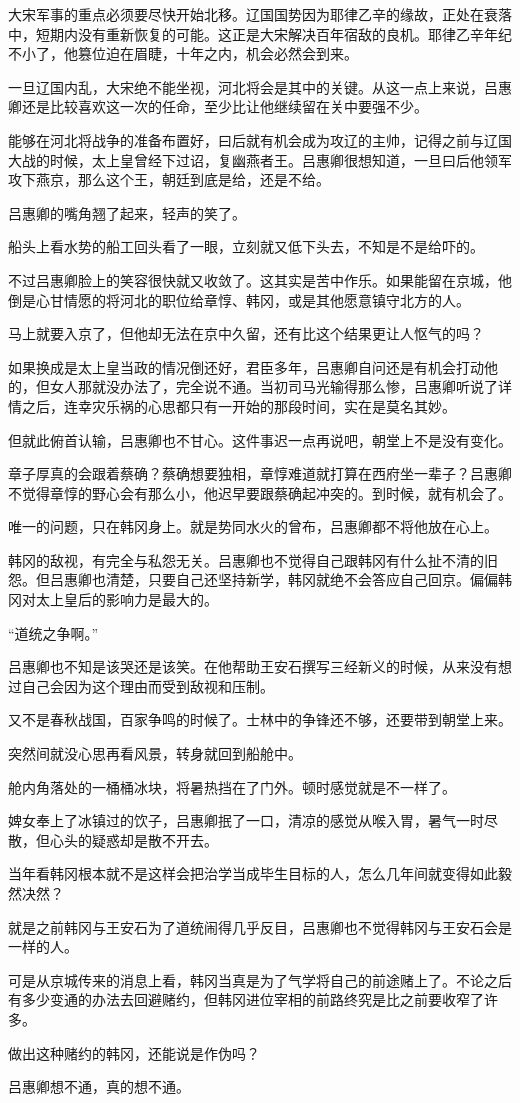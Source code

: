 大宋军事的重点必须要尽快开始北移。辽国国势因为耶律乙辛的缘故，正处在衰落中，短期内没有重新恢复的可能。这正是大宋解决百年宿敌的良机。耶律乙辛年纪不小了，他篡位迫在眉睫，十年之内，机会必然会到来。

一旦辽国内乱，大宋绝不能坐视，河北将会是其中的关键。从这一点上来说，吕惠卿还是比较喜欢这一次的任命，至少比让他继续留在关中要强不少。

能够在河北将战争的准备布置好，曰后就有机会成为攻辽的主帅，记得之前与辽国大战的时候，太上皇曾经下过诏，复幽燕者王。吕惠卿很想知道，一旦曰后他领军攻下燕京，那么这个王，朝廷到底是给，还是不给。

吕惠卿的嘴角翘了起来，轻声的笑了。

船头上看水势的船工回头看了一眼，立刻就又低下头去，不知是不是给吓的。

不过吕惠卿脸上的笑容很快就又收敛了。这其实是苦中作乐。如果能留在京城，他倒是心甘情愿的将河北的职位给章惇、韩冈，或是其他愿意镇守北方的人。

马上就要入京了，但他却无法在京中久留，还有比这个结果更让人怄气的吗？

如果换成是太上皇当政的情况倒还好，君臣多年，吕惠卿自问还是有机会打动他的，但女人那就没办法了，完全说不通。当初司马光输得那么惨，吕惠卿听说了详情之后，连幸灾乐祸的心思都只有一开始的那段时间，实在是莫名其妙。

但就此俯首认输，吕惠卿也不甘心。这件事迟一点再说吧，朝堂上不是没有变化。

章子厚真的会跟着蔡确？蔡确想要独相，章惇难道就打算在西府坐一辈子？吕惠卿不觉得章惇的野心会有那么小，他迟早要跟蔡确起冲突的。到时候，就有机会了。

唯一的问题，只在韩冈身上。就是势同水火的曾布，吕惠卿都不将他放在心上。

韩冈的敌视，有完全与私怨无关。吕惠卿也不觉得自己跟韩冈有什么扯不清的旧怨。但吕惠卿也清楚，只要自己还坚持新学，韩冈就绝不会答应自己回京。偏偏韩冈对太上皇后的影响力是最大的。

“道统之争啊。”

吕惠卿也不知是该哭还是该笑。在他帮助王安石撰写三经新义的时候，从来没有想过自己会因为这个理由而受到敌视和压制。

又不是春秋战国，百家争鸣的时候了。士林中的争锋还不够，还要带到朝堂上来。

突然间就没心思再看风景，转身就回到船舱中。

舱内角落处的一桶桶冰块，将暑热挡在了门外。顿时感觉就是不一样了。

婢女奉上了冰镇过的饮子，吕惠卿抿了一口，清凉的感觉从喉入胃，暑气一时尽散，但心头的疑惑却是散不开去。

当年看韩冈根本就不是这样会把治学当成毕生目标的人，怎么几年间就变得如此毅然决然？

就是之前韩冈与王安石为了道统闹得几乎反目，吕惠卿也不觉得韩冈与王安石会是一样的人。

可是从京城传来的消息上看，韩冈当真是为了气学将自己的前途赌上了。不论之后有多少变通的办法去回避赌约，但韩冈进位宰相的前路终究是比之前要收窄了许多。

做出这种赌约的韩冈，还能说是作伪吗？

吕惠卿想不通，真的想不通。
